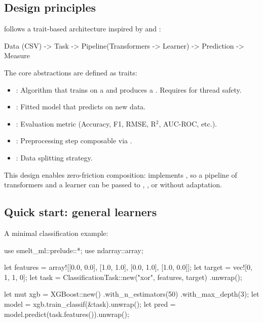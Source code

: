 \documentclass[article]{jss}
\newcommand{\fct}[1]{\code{#1()}}
\begin{document}
\subsection{Design principles}

 follows a trait-based architecture inspired by 
\citep{Lang+Binder+Richter:2019} and 
\citep{Pedregosa+Varoquaux+Gramfort:2011}:

\begin{Code}
Data (CSV) -> Task -> Pipeline(Transformers -> Learner)
                -> Prediction -> Measure
\end{Code}

The core abstractions are defined as  traits:

\begin{itemize}
\item {}: Algorithm that trains on a  and produces a
  . Requires  for thread safety.
\item {}: Fitted model that predicts on new data.
\item {}: Evaluation metric (Accuracy, F1, RMSE, R$^2$, AUC-ROC, etc.).
\item {}: Preprocessing step composable via .
\item {}: Data splitting strategy.
\end{itemize}

This design enables zero-friction composition:  implements
, so a pipeline of transformers and a learner can be passed to
\fct{benchmark}, , or  without adaptation.

\subsection{Quick start: general learners}

A minimal classification example:

\begin{CodeChunk}
\begin{CodeInput}
use smelt_ml::prelude::*;
use ndarray::array;

let features = array![[0.0, 0.0], [1.0, 1.0],
                       [0.0, 1.0], [1.0, 0.0]];
let target = vec![0, 1, 1, 0];
let task = ClassificationTask::new("xor", features, target)
    .unwrap();

let mut xgb = XGBoost::new()
    .with_n_estimators(50)
    .with_max_depth(3);
let model = xgb.train_classif(&task).unwrap();
let pred = model.predict(task.features()).unwrap();
\end{CodeInput}
\end{CodeChunk}
\end{document}
